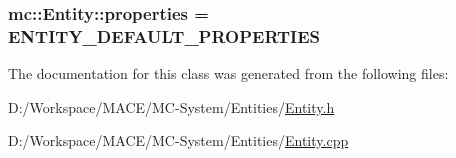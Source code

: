 \subsubsection[{\texorpdfstring{properties}{properties}}]{ mc\+::\+Entity\+::properties = {\bf E\+N\+T\+I\+T\+Y\+\_\+\+D\+E\+F\+A\+U\+L\+T\+\_\+\+P\+R\+O\+P\+E\+R\+T\+I\+ES}\hspace{0.3cm}{\ttfamily [protected]}}\hypertarget{classmc_1_1_entity_a4b96da9b66787566c63044472d690da1}{}\label{classmc_1_1_entity_a4b96da9b66787566c63044472d690da1}


The documentation for this class was generated from the following files\+:\begin{DoxyCompactItemize}
\item 
D\+:/\+Workspace/\+M\+A\+C\+E/\+M\+C-\/\+System/\+Entities/\hyperlink{_entity_8h}{Entity.\+h}\item 
D\+:/\+Workspace/\+M\+A\+C\+E/\+M\+C-\/\+System/\+Entities/\hyperlink{_entity_8cpp}{Entity.\+cpp}\end{DoxyCompactItemize}
